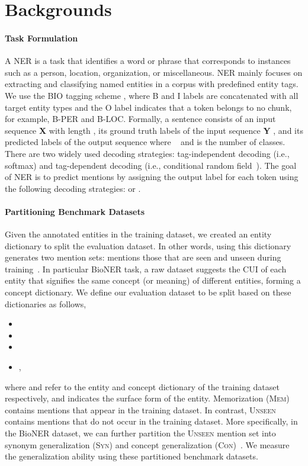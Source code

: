 \documentclass[11pt]{article}
\begin{document}
\section{Backgrounds}
\paragraph{Task Formulation}
A NER is a task that identifies a word or phrase that corresponds to instances such as a person, location, organization, or miscellaneous.
NER mainly focuses on extracting and classifying named entities in a corpus with predefined entity tags.
We use the BIO tagging scheme \cite{ramshaw1999text}, where B and I labels are concatenated with all target entity types and the O label indicates that a token belongs to no chunk, for example, B-PER and B-LOC.
Formally, a sentence consists of an input sequence \textbf{X}  \textbraceleft\textbraceright with length , its ground truth labels of the input sequence \textbf{Y}  \textbraceleft\textbraceright, and its predicted labels of the output sequence    where   \textbraceleft\textbraceright~ and  is the number of classes. 
There are two widely used decoding strategies: tag-independent decoding (i.e., softmax) and tag-dependent decoding (i.e., conditional random field~\cite{lafferty2001conditional}).
The goal of NER is to predict mentions by assigning the output label  for each token  using the following decoding strategies:  or .

\paragraph{Partitioning Benchmark Datasets}
\label{sec:partition}
Given the annotated entities in the training dataset, we created an entity dictionary to split the evaluation dataset.
In other words, using this dictionary generates two mention sets: mentions those that are seen and unseen during training~\cite{lin2020rigourous, kim2021your}.
In particular BioNER task, a raw dataset suggests the CUI of each entity that signifies the same concept (or meaning) of different entities, forming a concept dictionary.
We define our evaluation dataset to be split based on these dictionaries as follows,

\begin{itemize}[leftmargin=0.5in]
    \item 
    \item 
    \item 
    \item ,
\end{itemize}
where  and  refer to the entity and concept dictionary of the training dataset respectively, and  indicates the surface form of the entity.
Memorization (\textsc{Mem}) contains mentions that appear in the training dataset.
In contrast, \textsc{Unseen} contains mentions that do not occur in the training dataset.
More specifically, in the BioNER dataset, we can further partition the \textsc{Unseen} mention set into synonym generalization (\textsc{Syn}) and concept generalization (\textsc{Con})~\cite{kim2021your}.
We measure the generalization ability using these partitioned benchmark datasets.
\end{document}
